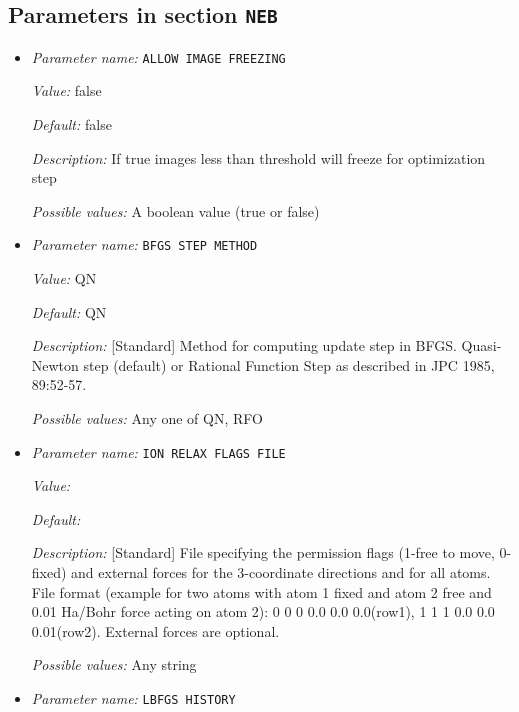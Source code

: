 \subsection{Parameters in section \tt NEB}
\label{parameters:NEB}

\begin{itemize}
\item {\it Parameter name:} {\tt ALLOW IMAGE FREEZING}
\label{parameters:NEB/ALLOW IMAGE FREEZING}
\label{parameters:NEB/ALLOW_20IMAGE_20FREEZING}


{\it Value:} false


{\it Default:} false


{\it Description:} If true images less than threshold will freeze for optimization step


{\it Possible values:} A boolean value (true or false)
\item {\it Parameter name:} {\tt BFGS STEP METHOD}
\label{parameters:NEB/BFGS STEP METHOD}
\label{parameters:NEB/BFGS_20STEP_20METHOD}


{\it Value:} QN


{\it Default:} QN


{\it Description:} [Standard] Method for computing update step in BFGS. Quasi-Newton step (default) or Rational Function Step as described in JPC 1985, 89:52-57.


{\it Possible values:} Any one of QN, RFO
\item {\it Parameter name:} {\tt ION RELAX FLAGS FILE}
\label{parameters:NEB/ION RELAX FLAGS FILE}
\label{parameters:NEB/ION_20RELAX_20FLAGS_20FILE}


{\it Value:} 


{\it Default:} 


{\it Description:} [Standard] File specifying the permission flags (1-free to move, 0-fixed) and external forces for the 3-coordinate directions and for all atoms. File format (example for two atoms with atom 1 fixed and atom 2 free and 0.01 Ha/Bohr force acting on atom 2): 0 0 0 0.0 0.0 0.0(row1), 1 1 1 0.0 0.0 0.01(row2). External forces are optional.


{\it Possible values:} Any string
\item {\it Parameter name:} {\tt LBFGS HISTORY}
\label{parameters:NEB/LBFGS HISTORY}
\label{parameters:NEB/LBFGS_20HISTORY}



\end{itemize}
